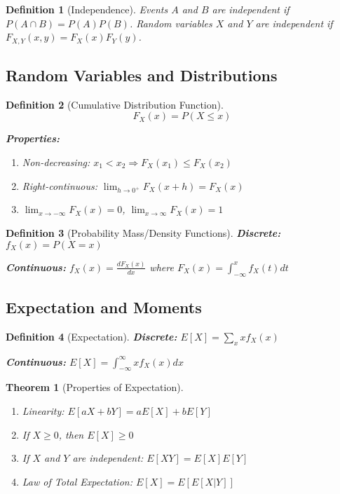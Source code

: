 \documentclass[12pt,a4paper]{amsart}
\newtheorem{theorem}{Theorem}[section]
\newtheorem{definition}{Definition}[section]
\theoremstyle{remark}
\begin{document}
\begin{definition}[Independence]
Events $A$ and $B$ are independent if $P(A \cap B) = P(A)P(B)$.
Random variables $X$ and $Y$ are independent if $F_{X,Y}(x,y) = F_X(x)F_Y(y)$.
\end{definition}

\subsection{Random Variables and Distributions}

\begin{definition}[Cumulative Distribution Function]
$$F_X(x) = P(X \leq x)$$

\textbf{Properties:}
\begin{enumerate}
\item Non-decreasing: $x_1 < x_2 \Rightarrow F_X(x_1) \leq F_X(x_2)$
\item Right-continuous: $\lim_{h \to 0^+} F_X(x+h) = F_X(x)$
\item $\lim_{x \to -\infty} F_X(x) = 0$, $\lim_{x \to \infty} F_X(x) = 1$
\end{enumerate}
\end{definition}

\begin{definition}[Probability Mass/Density Functions]
\textbf{Discrete:} $f_X(x) = P(X = x)$

\textbf{Continuous:} $f_X(x) = \frac{dF_X(x)}{dx}$ where $F_X(x) = \int_{-\infty}^x f_X(t) dt$
\end{definition}

\subsection{Expectation and Moments}

\begin{definition}[Expectation]
\textbf{Discrete:} $E[X] = \sum_x x f_X(x)$

\textbf{Continuous:} $E[X] = \int_{-\infty}^{\infty} x f_X(x) dx$
\end{definition}

\begin{theorem}[Properties of Expectation]
\begin{enumerate}
\item Linearity: $E[aX + bY] = aE[X] + bE[Y]$
\item If $X \geq 0$, then $E[X] \geq 0$
\item If $X$ and $Y$ are independent: $E[XY] = E[X]E[Y]$
\item Law of Total Expectation: $E[X] = E[E[X|Y]]$
\end{enumerate}
\end{theorem}
\end{document}
